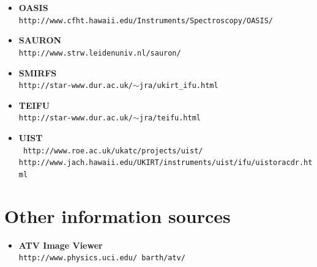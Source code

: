 \documentclass[twoside,11pt]{article}
\newcommand{\htmladdnormallink}[2]{#1}
\newcommand{\xlabel}[1]{}
\begin{document}
{\begin{small}
\begin{itemize}
\item {\bf\label{sc16_available_oasis}OASIS}\\
\htmladdnormallink{{\tt http://www.cfht.hawaii.edu/Instruments/Spectroscopy/OASIS/}}{http://www.cfht.hawaii.edu/Instruments/Spectroscopy/OASIS/}

\item {\bf\label{sc16_available_sauron}SAURON}\\
\htmladdnormallink{{\tt http://www.strw.leidenuniv.nl/sauron/}}{http://www.strw.leidenuniv.nl/sauron/}

\item {\bf\label{sc16_available_smirfs}SMIRFS}\\
\htmladdnormallink{{\tt http://star-www.dur.ac.uk/$\sim$jra/ukirt\_ifu.html}}{http://star-www.dur.ac.uk/~jra/ukirt_ifu.html}

\item {\bf\label{sc16_available_teifu}TEIFU}\\
\htmladdnormallink{{\tt http://star-www.dur.ac.uk/$\sim$jra/teifu.html}}{http://star-www.dur.ac.uk/~jra/teifu.html}

\item {\bf\label{sc16_available_uist}UIST}\\
\htmladdnormallink{{\tt
http://www.roe.ac.uk/ukatc/projects/uist/}}{http://www.roe.ac.uk/ukatc/projects/uist/}\\
\htmladdnormallink{{\tt http://www.jach.hawaii.edu/UKIRT/instruments/uist/ifu/uistoracdr.html}}{http://www.jach.hawaii.edu/UKIRT/instruments/uist/ifu/uistoracdr.html}

\end{itemize}
\end{small}

\section{\xlabel{sc16_sources}Other information sources\label{sc16_sources}}

\begin{small}
\begin{itemize}


\item {\bf\label{sc16_sources_atv}ATV Image Viewer}\\
\htmladdnormallink{{\tt http://www.physics.uci.edu/~barth/atv/}}{http://www.physics.uci.edu/~barth/atv/}


\end{itemize}
\end{small}}
\end{document}
